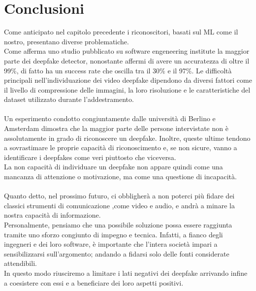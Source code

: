 \documentclass[12pt, a4paper]{article}
\begin{document}
\section{Conclusioni}
Come anticipato nel capitolo precedente i riconoscitori, basati sul ML come il nostro, presentano diverse problematiche.\\
Come afferma uno studio pubblicato su software engeneering institute \cite{bernaciak_2022} la maggior parte dei deepfake detector, nonostante affermi di avere un accuratezza di oltre il 99\%, di fatto ha un success rate che oscilla tra il 30\% e il 97\%. Le difficoltà principali nell'individuazione dei video deepfake dipendono da diversi fattori come il livello di compressione delle immagini, la loro risoluzione e le caratteristiche del dataset utilizzato durante l'addestramento.\\\\
Un esperimento condotto congiuntamente dalle università di Berlino e Amsterdam \cite{KOBIS2021103364} dimostra che la maggior parte delle persone intervistate non è assolutamente in grado di riconoscere un deepfake. Inoltre, queste ultime tendono a sovrastimare le proprie capacità di riconoscimento e, se non sicure, vanno a identificare i deepfakes come veri piuttosto che viceversa.\\La non capacità di individuare un deepfake non appare quindi come una mancanza di attenzione o motivazione, ma come una questione di incapacità.\\\\
Quanto detto, nel prossimo futuro, ci obbligherà a non poterci più fidare dei classici strumenti di comunicazione ,come video e audio, e andrà a minare la nostra capacità di informazione.\\
Personalmente, pensiamo che una possibile soluzione possa essere raggiunta tramite uno sforzo congiunto di impegno e tecnica. Infatti, a fianco degli ingegneri e dei loro software, è importante che l'intera società impari a sensibilizzarsi sull'argomento; andando a fidarsi solo delle fonti considerate attendibili.\\ In questo modo riusciremo a limitare i lati negativi dei deepfake arrivando infine a coesistere con essi e a beneficiare dei loro aspetti positivi. 





\newpage


\end{document}
